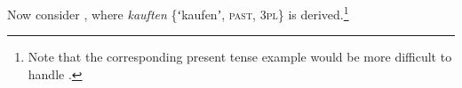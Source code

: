 \documentclass[output=paper]{langsci/langscibook}
\begin{document}
Now consider , where \textit{kauften} \{ʻkaufenʼ, \textsc{past}, 3\textsc{pl}\} is derived.\footnote{Note that the corresponding present tense example would be more difficult to handle \citep[231]{Spencer2019}.}


\begin{figure}




\end{figure}
\end{document}
